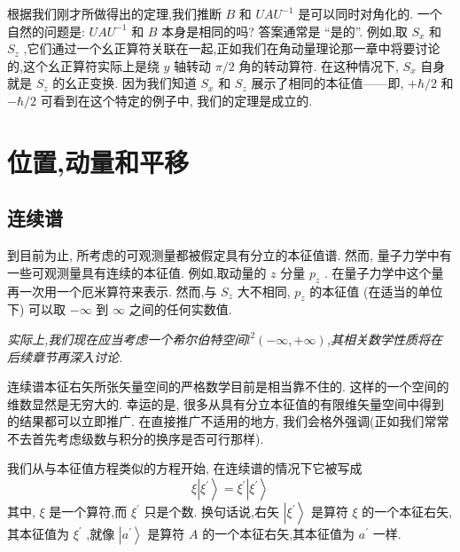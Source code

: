 	根据我们刚才所做得出的定理,我们推断 $B$ 和 ${UA}{U}^{-1}$ 是可以同时对角化的. 一个自然的问题是: ${UA}{U}^{-1}$ 和 $B$ 本身是相同的吗? 答案通常是 “是的”. 例如,取 ${S}_{x}$ 和 ${S}_{z}$ ,它们通过一个幺正算符关联在一起,正如我们在角动量理论那一章中将要讨论的,这个幺正算符实际上是绕 $y$ 轴转动 $\pi /2$ 角的转动算符. 在这种情况下, ${S}_{x}$ 自身就是 ${S}_{z}$ 的幺正变换. 因为我们知道 ${S}_{x}$ 和 ${S}_{z}$ 展示了相同的本征值——即, $+ \hbar /2$ 和 $- \hbar /2$ 可看到在这个特定的例子中, 我们的定理是成立的.
	\section{位置,动量和平移}
	\subsection{连续谱}
	到目前为止, 所考虑的可观测量都被假定具有分立的本征值谱. 然而, 量子力学中有一些可观测量具有连续的本征值. 例如,取动量的 $z$ 分量 ${p}_{z}$ . 在量子力学中这个量再一次用一个厄米算符来表示. 然而,与 ${S}_{z}$ 大不相同, ${p}_{z}$ 的本征值 (在适当的单位下) 可以取 $- \infty$ 到 $\infty$ 之间的任何实数值.
	
	\begin{remark}
		\textit{	实际上,我们现在应当考虑一个希尔伯特空间$l^2(-\infty,+\infty)$,其相关数学性质将在后续章节再深入讨论.}
	\end{remark}
	
	连续谱本征右矢所张矢量空间的严格数学目前是相当靠不住的. 这样的一个空间的维数显然是无穷大的. 幸运的是, 很多从具有分立本征值的有限维矢量空间中得到的结果都可以立即推广. 在直接推广不适用的地方, 我们会格外强调(正如我们常常不去首先考虑级数与积分的换序是否可行那样).
	
	我们从与本征值方程类似的方程开始, 在连续谱的情况下它被写成
	\begin{equation}
		\xi \left| {\xi }^{\prime }\right\rangle = {\xi }^{\prime }\left| {\xi }^{\prime }\right\rangle
	\end{equation}
	其中, $\xi$ 是一个算符,而 ${\xi }^{\prime }$ 只是个数. 换句话说,右矢 $\left| {\xi }^{\prime }\right\rangle$ 是算符 $\xi$ 的一个本征右矢,其本征值为 ${\xi }^{\prime }$ ,就像 $\left| {a}^{\prime }\right\rangle$ 是算符 $A$ 的一个本征右矢,其本征值为 ${a}^{\prime }$ 一样.
	
